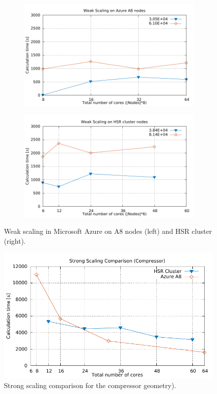 \documentclass[3p,times]{elsarticle}
\begin{document}
\begin{figure}
\centering
\begin{subfigure}{.5\textwidth}
	\centering
	\includegraphics[width=\linewidth]{gplt-a8-weak-pipe}	
	\label{fig:weakA8}
\end{subfigure}
\begin{subfigure}{.5\textwidth}
	\centering
	\includegraphics[width=\linewidth]{gplt-hsr-weak-pipe}
	\label{fig:weakHSR}
\end{subfigure}

\caption{Weak scaling in Microsoft Azure on A8 nodes (left) and HSR cluster (right). }
\label{fig:weakPipe}
\end{figure}

\begin{figure}
	\centering
	\includegraphics[width=0.5\linewidth]{gplt-compressor}
	\caption{Strong scaling comparison for the compressor geometry). }
	\label{fig:compressor}
\end{figure}
\end{document}
